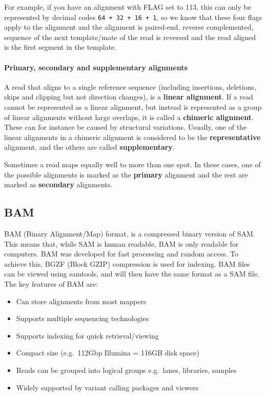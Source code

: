 \documentclass[11pt]{article}
\providecommand{\tightlist}{%
      \setlength{\itemsep}{0pt}\setlength{\parskip}{0pt}}
\begin{document}
For example, if you have an alignment with FLAG set to 113, this can
only be represented by decimal codes \texttt{64\ +\ 32\ +\ 16\ +\ 1}, so
we know that these four flags apply to the alignment and the alignment
is paired-end, reverse complemented, sequence of the next template/mate
of the read is reversed and the read aligned is the first segment in the
template.

\hypertarget{primary-secondary-and-supplementary-alignments}{%
\paragraph{Primary, secondary and supplementary
alignments}\label{primary-secondary-and-supplementary-alignments}}

A read that aligns to a single reference sequence (including insertions,
deletions, skips and clipping but not direction changes), is a
\textbf{linear alignment}. If a read cannot be represented as a linear
alignment, but instead is represented as a group of linear alignments
without large overlaps, it is called a \textbf{chimeric alignment}.
These can for instance be caused by structural variations. Usually, one
of the linear alignments in a chimeric alignment is considered to be the
\textbf{representative} alignment, and the others are called
\textbf{supplementary}.

Sometimes a read maps equally well to more than one spot. In these
cases, one of the possible alignments is marked as the \textbf{primary}
alignment and the rest are marked as \textbf{secondary} alignments.

\hypertarget{bam}{%
\subsection{BAM}\label{bam}}

BAM (Binary Alignment/Map) format, is a compressed binary version of
SAM. This means that, while SAM is human readable, BAM is only readable
for computers. BAM was developed for fast processing and random access.
To achieve this, BGZF (Block GZIP) compression is used for indexing. BAM
files can be viewed using samtools, and will then have the same format
as a SAM file. The key features of BAM are:

\begin{itemize}
\tightlist
\item
  Can store alignments from most mappers
\item
  Supports multiple sequencing technologies
\item
  Supports indexing for quick retrieval/viewing
\item
  Compact size (e.g.~112Gbp Illumina = 116GB disk space)
\item
  Reads can be grouped into logical groups e.g.~lanes, libraries,
  samples
\item
  Widely supported by variant calling packages and viewers
\end{itemize}
\end{document}
